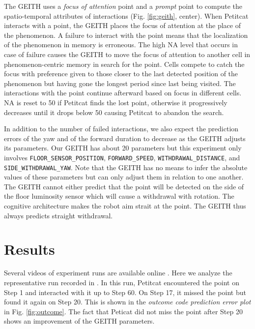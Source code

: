 \documentclass[runningheads]{llncs}
\begin{document}
The GEITH uses a \textit{focus of attention} point and a \textit{prompt} point to compute the spatio-temporal attributes of interactions (Fig. \ref{fig:geith}, center). 
When Petitcat interacts with a point, the GEITH places the focus of attention at the place of the phenomenon. 
A failure to interact with the point means that the localization of the phenomenon in memory is erroneous. 
The high NA level that occurs in case of failure causes the GEITH to move the focus of attention to another cell in phenomenon-centric memory in search for the point.
Cells compete to catch the focus with preference given to those closer to the last detected position of the phenomenon but having gone the longest period since last being visited.
The interactions with the point continue afterward based on focus in different cells. 
NA is reset to 50 if Petitcat finds the lost point, otherwise it progressively decreases until it drops below 50 causing Petitcat to abandon the search. 

In addition to the number of failed interactions, we also expect the prediction errors of the yaw and of the forward duration to decrease as the GEITH adjusts its parameters. 
Our GEITH has about 20 parameters but this experiment only involves \texttt{FLOOR\_SENSOR\_POSITION}, \texttt{FORWARD\_SPEED}, \texttt{WITHDRAWAL\_DIS\-TANCE}, and \texttt{SIDE\_WITH\-DRA\-WAL\_YAW}.
Note that the GEITH has no means to infer the absolute values of these parameters but can only adjust them in relation to one another.
The GEITH cannot either predict that the point will be detected on the side of the floor luminosity sensor which will cause a withdrawal with rotation. 
The cognitive architecture makes the robot aim strait at the point.
The GEITH thus always predicts straight withdrawal. 



\section{Results}
\label{sec:results}

Several videos of experiment runs are available online \cite{georgeon_petitcat_playlist}. 
Here we analyze the representative run recorded in \cite{georgeon_petitcat_2024}.
In this run, Petitcat encountered the point on Step 1 and interacted with it up to Step 60.
On Step 17, it missed the point but found it again on Step 20.
This is shown in the \textit{outcome code prediction error plot} in Fig. \ref{fig:outcome}. 
The fact that Peticat did not miss the point after Step 20 shows an improvement of the GEITH parameters.
\end{document}
